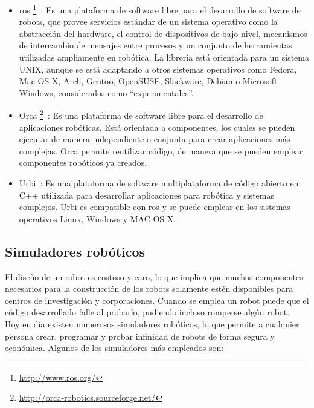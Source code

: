 \begin{itemize}
\item \acrfull{ros} \footnote{\url{http://www.ros.org/}}~\cite{middleware1}: Es una plataforma de software libre para el desarrollo de software de robots, que provee servicios estándar de un sistema operativo como la abstracción del hardware, el control de dispositivos de bajo nivel, mecanismos de intercambio de mensajes entre procesos y un conjunto de herramientas utilizadas ampliamente en robótica. La librería está orientada para un sistema UNIX, aunque se está adaptando a otros sistemas operativos como Fedora, Mac OS X, Arch, Gentoo, OpenSUSE, Slackware, Debian o Microsoft Windows, considerados como ``experimentales''.
\item Orca \footnote{\url{http://orca-robotics.sourceforge.net/}}~\cite{middleware1}: Es una plataforma de software libre para el desarrollo de aplicaciones robóticas. Está orientada a componentes, los cuales se pueden ejecutar de manera independiente o conjunta para crear aplicaciones más complejas. Orca permite reutilizar código, de manera que se pueden emplear componentes robóticos ya creados.
\item Urbi~\cite{urbi}: Es una plataforma de software multiplataforma de código abierto en C++ utilizada para desarrollar aplicaciones para robótica y sistemas complejos. Urbi es compatible con \acrshort{ros} y se puede emplear en los sistemas operativos Linux, Windows y MAC OS X.
\end{itemize}

\subsection{Simuladores robóticos}
El diseño de un robot es costoso y caro, lo que implica que muchos componentes necesarios para la construcción de los robots solamente estén disponibles para centros de investigación y corporaciones. Cuando se emplea un robot puede que el código desarrollado falle al probarlo, pudiendo incluso romperse algún robot.\\

Hoy en día existen numerosos simuladores robóticos, lo que permite a cualquier persona crear, programar y probar infinidad de robots de forma segura y económica. Algunos de los simuladores más empleados son:

